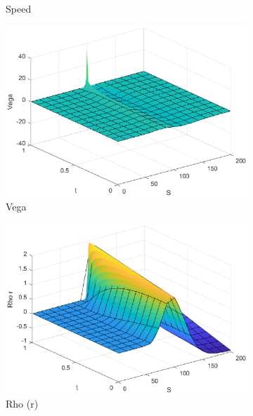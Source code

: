 \begin{figure}[H]
\begin{subfigure}[b]{0.35\linewidth}
        \caption{Speed}
    \end{subfigure}
    \begin{subfigure}[b]{0.35\linewidth}
        \includegraphics[width=\linewidth]{Imagenes/6_Sols/Binary_Call/Binary_Call_Vega.eps}
        \caption{Vega}
    \end{subfigure}
    \begin{subfigure}[b]{0.35\linewidth}
        \includegraphics[width=\linewidth]{Imagenes/6_Sols/Binary_Call/Binary_Call_Rho_r.eps}
        \caption{Rho (r)}
    \end{subfigure}
    \begin{subfigure}[b]{0.35\linewidth}

\end{subfigure}
\end{figure}
